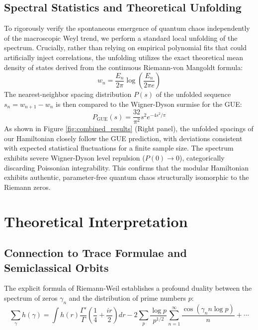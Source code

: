 \documentclass[prl,aps,floatfix,superscriptaddress,10pt]{revtex4-2}
\begin{document}
\subsection{Spectral Statistics and Theoretical Unfolding}
To rigorously verify the spontaneous emergence of quantum chaos independently of the macroscopic Weyl trend, we perform a standard local unfolding of the spectrum. Crucially, rather than relying on empirical polynomial fits that could artificially inject correlations, the unfolding utilizes the exact theoretical mean density of states derived from the continuous Riemann-von Mangoldt formula:
\begin{equation}
w_n = \frac{E_n}{2\pi} \log\left(\frac{E_n}{2\pi e}\right)
\end{equation}
The nearest-neighbor spacing distribution $P(s)$ of the unfolded sequence $s_n = w_{n+1} - w_n$ is then compared to the Wigner-Dyson surmise for the GUE:
\begin{equation}
P_{\text{GUE}}(s) = \frac{32}{\pi^2} s^2 e^{-4s^2/\pi}
\end{equation}
As shown in Figure \ref{fig:combined_results} (Right panel), the unfolded spacings of our Hamiltonian closely follow the GUE prediction, with deviations consistent with expected statistical fluctuations for a finite sample size. The spectrum exhibits severe Wigner-Dyson level repulsion ($P(0) \to 0$), categorically discarding Poissonian integrability. This confirms that the modular Hamiltonian exhibits authentic, parameter-free quantum chaos structurally isomorphic to the Riemann zeros.

\section{Theoretical Interpretation}

\subsection{Connection to Trace Formulae and Semiclassical Orbits}

The explicit formula of Riemann-Weil establishes a profound duality between the spectrum of zeros $\gamma_n$ and the distribution of prime numbers $p$:
\begin{equation}
\sum_{\gamma} h(\gamma) = \int h(r) \frac{\Gamma'}{\Gamma}\left(\frac14 + \frac{ir}{2}\right) dr - 2\sum_{p} \frac{\log p}{p^{1/2}} \sum_{n=1}^\infty \frac{\cos(\gamma_n n\log p)}{n} + \cdots
\end{equation}
\end{document}
